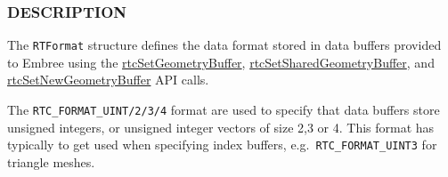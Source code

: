 \begin{Shaded}
\begin{Highlighting}[]

\OperatorTok{\{}
\OperatorTok{,}
\OperatorTok{,}
\OperatorTok{,}
\OperatorTok{,}

\OperatorTok{,}
\OperatorTok{,}
\OperatorTok{,}
\OperatorTok{,}
\OperatorTok{,}
\OperatorTok{,}
\OperatorTok{,}
\OperatorTok{,}
\OperatorTok{,}
\OperatorTok{,}
\OperatorTok{,}
\OperatorTok{,}
\OperatorTok{,}
\OperatorTok{,}
\OperatorTok{,}
\OperatorTok{,}

\OperatorTok{,}
\OperatorTok{,}

\OperatorTok{,}
\OperatorTok{,}

\OperatorTok{,}
\OperatorTok{\};}
\end{Highlighting}
\end{Shaded}

\subsubsection{DESCRIPTION}\label{description}

The \texttt{RTFormat} structure defines the data format stored in data
buffers provided to Embree using the
\hyperref[rtcsetgeometrybuffer]{rtcSetGeometryBuffer},
\hyperref[rtcsetsharedgeometrybuffer]{rtcSetSharedGeometryBuffer}, and
\hyperref[rtcsetnewgeometrybuffer]{rtcSetNewGeometryBuffer} API calls.

The \texttt{RTC\_FORMAT\_UINT/2/3/4} format are used to specify that
data buffers store unsigned integers, or unsigned integer vectors of
size 2,3 or 4. This format has typically to get used when specifying
index buffers, e.g.~\texttt{RTC\_FORMAT\_UINT3} for triangle meshes.

